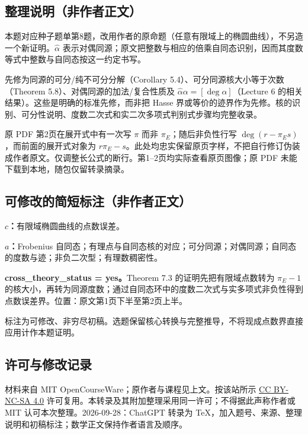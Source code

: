 \documentclass[UTF8,11pt]{ctexart}
\begin{document}
\subsection*{整理说明（非作者正文）}
本题对应种子题单第8题，改用作者的原命题（任意有限域上的椭圆曲线），不另造一个新证明。$\widehat\alpha$ 表示对偶同源；原文把整数与相应的倍乘自同态识别，因而其度数等式中整数与自同态按这一约定书写。

先修为同源的可分/纯不可分分解（Corollary 5.4）、可分同源核大小等于次数（Theorem 5.8）、对偶同源的加法/复合性质及 $\widehat\alpha\alpha=[\deg\alpha]$（Lecture 6 的相关结果）。这些是明确的标准先修，而非把 Hasse 界或等价的迹界作为先修。核的识别、可分性说明、度数二次式和实二次多项式判别式步骤均完整收录。

原 PDF 第2页在展开式中有一次写 $\pi$ 而非 $\pi_E$；随后非负性行写 $\deg(r-\pi_Es)$，而前面的展开式对象为 $r\pi_E-s$。此处均忠实保留原页字样，不把自行修订伪装成作者原文。仅调整长公式的断行。第1--2页均实际查看原页图像；原 PDF 未能下载到本地，随包仅留转录摘录。

\subsection*{可修改的简短标注（非作者正文）}
\textbf{$c$：}有限域椭圆曲线的点数误差。

\textbf{$a$：}Frobenius 自同态；有理点与自同态核的对应；可分同源；对偶同源；自同态的度数与迹；非负二次型；有理数稠密性。

\textbf{cross\_theory\_status = yes。}Theorem 7.3 的证明先把有限域点数转为 $\pi_E-1$ 的核大小，再转为同源度数；通过自同态环中的度数二次式与实多项式非负性得到点数误差界。位置：原文第1页下半至第2页上半。

标注为可修改、非穷尽初稿。选题保留核心转换与完整推导，不将现成点数界直接应用计作本题证明。
\subsection*{许可与修改记录}
材料来自 MIT OpenCourseWare；原作者与课程见上文。按该站所示 \href{https://creativecommons.org/licenses/by-nc-sa/4.0/}{CC BY-NC-SA 4.0} 许可复用。本转录及其附加整理采用同一许可；不得据此声称作者或 MIT 认可本次整理。2026-09-28：ChatGPT 转录为 TeX，加入题号、来源、整理说明和初稿标注；数学正文保持作者语言及顺序。
\end{document}
